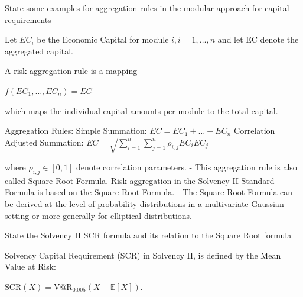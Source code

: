 State some examples for aggregation rules in the modular approach for capital requirements

Let \( EC_i \) be the Economic Capital for module \( i, i = 1, \ldots, n \) and let EC denote the aggregated capital.

A risk aggregation rule is a mapping

\( f(EC_1, \ldots, EC_n) = EC \)

which maps the individual capital amounts per module to the total capital.

Aggregation Rules:
Simple Summation: \( EC = EC_1 + \ldots + EC_n \)
Correlation Adjusted Summation:
\( EC = \sqrt{\sum_{i=1}^{n} \sum_{j=1}^{n} \rho_{i,j} EC_i EC_j} \)

where \( \rho_{i,j} \in [0, 1] \) denote correlation parameters.
- This aggregation rule is also called Square Root Formula. 
  Risk aggregation in the Solvency II Standard Formula is based on the Square Root Formula.
- The Square Root Formula can be derived at the level of probability distributions in a multivariate Gaussian setting 
  or more generally for elliptical distributions.


State the Solvency II SCR formula and its relation to the Square Root formula 

Solvency Capital Requirement (SCR) in Solvency II, is defined by the Mean Value at Risk:

\( \text{SCR}(X) = \text{V@R}_{0.005}(X - \mathbb{E}[X]). \)

